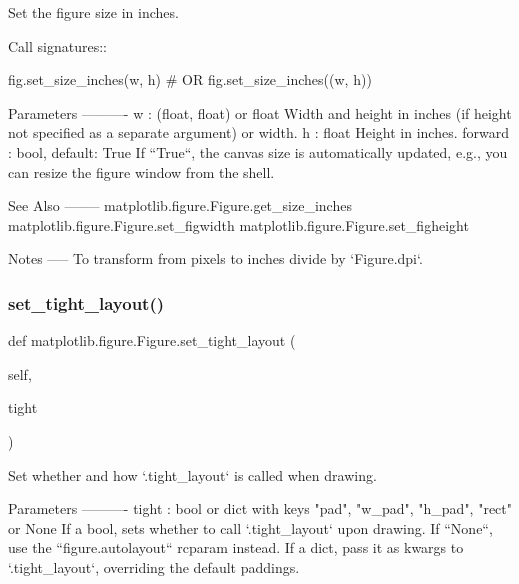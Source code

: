 \begin{DoxyVerb}Set the figure size in inches.

Call signatures::

     fig.set_size_inches(w, h)  # OR
     fig.set_size_inches((w, h))

Parameters
----------
w : (float, float) or float
    Width and height in inches (if height not specified as a separate
    argument) or width.
h : float
    Height in inches.
forward : bool, default: True
    If ``True``, the canvas size is automatically updated, e.g.,
    you can resize the figure window from the shell.

See Also
--------
matplotlib.figure.Figure.get_size_inches
matplotlib.figure.Figure.set_figwidth
matplotlib.figure.Figure.set_figheight

Notes
-----
To transform from pixels to inches divide by `Figure.dpi`.
\end{DoxyVerb}
 \mbox{\label{classmatplotlib_1_1figure_1_1Figure_adc3cb28596f3d2e2fa2e73253156a07e}} 
\subsubsection{\texorpdfstring{set\+\_\+tight\+\_\+layout()}{set\_tight\_layout()}}
{\footnotesize\ttfamily def matplotlib.\+figure.\+Figure.\+set\+\_\+tight\+\_\+layout (\begin{DoxyParamCaption}\item[{}]{self,  }\item[{}]{tight }\end{DoxyParamCaption})}

\begin{DoxyVerb}Set whether and how `.tight_layout` is called when drawing.

Parameters
----------
tight : bool or dict with keys "pad", "w_pad", "h_pad", "rect" or None
    If a bool, sets whether to call `.tight_layout` upon drawing.
    If ``None``, use the ``figure.autolayout`` rcparam instead.
    If a dict, pass it as kwargs to `.tight_layout`, overriding the
    default paddings.
\end{DoxyVerb}
 \mbox{\label{classmatplotlib_1_1figure_1_1Figure_a80c053e0c4f7d70be80e25d239503ef7}} 

